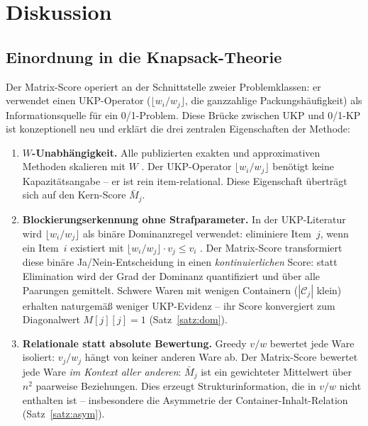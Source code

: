 \documentclass[a4paper,11pt]{article}
\begin{document}
\section{Diskussion}

\subsection{Einordnung in die Knapsack-Theorie}

Der Matrix-Score operiert an der Schnittstelle zweier
Problemklassen: er verwendet einen UKP-Operator
($\lfloor w_i/w_j \rfloor$, die ganzzahlige Packungshäufigkeit)
als Informationsquelle für ein 0/1-Problem.
Diese Brücke zwischen UKP und 0/1-KP ist konzeptionell neu
und erklärt die drei zentralen Eigenschaften der Methode:

\begin{enumerate}[leftmargin=*]
  \item \textbf{$W$-Unabhängigkeit.}
    Alle publizierten exakten und approximativen Methoden
    skalieren mit $W$ \citep{kellerer2004,balev2008}.
    Der UKP-Operator $\lfloor w_i/w_j \rfloor$ benötigt
    keine Kapazitätsangabe -- er ist rein item-relational.
    Diese Eigenschaft überträgt sich auf den Kern-Score $\bar{M}_j$.

  \item \textbf{Blockierungserkennung ohne Strafparameter.}
    In der UKP-Literatur wird $\lfloor w_i/w_j \rfloor$ als
    binäre Dominanzregel verwendet: eliminiere Item~$j$, wenn
    ein Item~$i$ existiert mit $\lfloor w_i/w_j \rfloor \cdot v_j
    \le v_i$ \citep{kellerer2004,andonov2000}.
    Der Matrix-Score transformiert diese binäre Ja/Nein-Entscheidung
    in einen \emph{kontinuierlichen} Score: statt Elimination
    wird der Grad der Dominanz quantifiziert und über alle
    Paarungen gemittelt.
    Schwere Waren mit wenigen Containern ($|\mathcal{C}_j|$ klein)
    erhalten naturgemäß weniger UKP-Evidenz -- ihr Score
    konvergiert zum Diagonalwert $M[j][j] = 1$
    (Satz~\ref{satz:dom}).

  \item \textbf{Relationale statt absolute Bewertung.}
    Greedy $v/w$ bewertet jede Ware isoliert: $v_j/w_j$ hängt
    von keiner anderen Ware ab. Der Matrix-Score bewertet jede
    Ware \emph{im Kontext aller anderen}: $\bar{M}_j$ ist ein
    gewichteter Mittelwert über $n^2$ paarweise Beziehungen.
    Dies erzeugt Struktur\-information, die in $v/w$ nicht
    enthalten ist -- insbesondere die Asymmetrie der
    Container-Inhalt-Relation (Satz~\ref{satz:asym}).
\end{enumerate}
\end{document}
